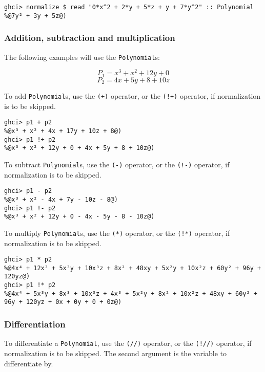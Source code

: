 \documentclass[11pt,a4paper]{article}
\begin{document}
\begin{lstlisting}
ghci> normalize $ read "0*x^2 + 2*y + 5*z + y + 7*y^2" :: Polynomial
%@7y² + 3y + 5z@)
\end{lstlisting}

\subsubsection{Addition, subtraction and multiplication}

The following examples will use the \lstinline{Polynomial}s:

$$ P_1 = x^3 + x^2 + 12y + 0 $$
$$ P_2 = 4x + 5y + 8 + 10z $$

To add \lstinline{Polynomial}s, use the \lstinline{(+)} operator, or the \lstinline{(!+)} operator, if normalization is to be skipped.

\begin{lstlisting}
ghci> p1 + p2
%@x³ + x² + 4x + 17y + 10z + 8@)
ghci> p1 !+ p2
%@x³ + x² + 12y + 0 + 4x + 5y + 8 + 10z@)
\end{lstlisting}

To subtract \lstinline{Polynomial}s, use the \lstinline{(-)} operator, or the \lstinline{(!-)} operator, if normalization is to be skipped.

\begin{lstlisting}
ghci> p1 - p2
%@x³ + x² - 4x + 7y - 10z - 8@)
ghci> p1 !- p2
%@x³ + x² + 12y + 0 - 4x - 5y - 8 - 10z@)
\end{lstlisting}

To multiply \lstinline{Polynomial}s, use the \lstinline{(*)} operator, or the \lstinline{(!*)} operator, if normalization is to be skipped.

\begin{lstlisting}
ghci> p1 * p2
%@4x⁴ + 12x³ + 5x³y + 10x³z + 8x² + 48xy + 5x²y + 10x²z + 60y² + 96y + 120yz@)
ghci> p1 !* p2
%@4x⁴ + 5x³y + 8x³ + 10x³z + 4x³ + 5x²y + 8x² + 10x²z + 48xy + 60y² + 96y + 120yz + 0x + 0y + 0 + 0z@)
\end{lstlisting}

\subsubsection{Differentiation}

To differentiate a \lstinline{Polynomial}, use the \lstinline{(//)} operator, or the \lstinline{(!//)} operator, if normalization is to be skipped.
The second argument is the variable to differentiate by.
\end{document}
